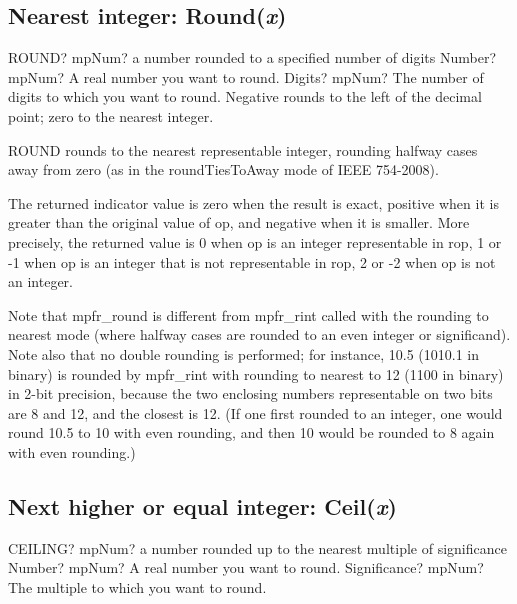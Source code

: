 \subsection{Nearest integer: Round(\textit{x})}

\begin{mpFunctionsExtract}
	\mpWorksheetFunctionTwoNotImplemented
	{ROUND? mpNum? a number rounded to a specified number of digits}
	{Number? mpNum? A real number you want to round.}
	{Digits? mpNum? The number of digits to which you want to round. Negative rounds to the left of the decimal point; zero to the nearest integer.}
\end{mpFunctionsExtract}

\vspace{0.3cm}
ROUND rounds to the nearest representable integer, rounding halfway cases away from zero (as in the roundTiesToAway mode of IEEE 754-2008).

The returned indicator value is zero when the result is exact, positive when it is greater than the
original value of op, and negative when it is smaller. More precisely, the returned value is
0 when op is an integer representable in rop, 1 or -1 when op is an integer that is not
representable in rop, 2 or -2 when op is not an integer.

Note that mpfr\_round is different from mpfr\_rint called with the rounding to nearest mode
(where halfway cases are rounded to an even integer or significand). Note also that no double
rounding is performed; for instance, 10.5 (1010.1 in binary) is rounded by mpfr\_rint with
rounding to nearest to 12 (1100 in binary) in 2-bit precision, because the two enclosing
numbers representable on two bits are 8 and 12, and the closest is 12. (If one first rounded
to an integer, one would round 10.5 to 10 with even rounding, and then 10 would be rounded
to 8 again with even rounding.)


\subsection{Next higher or equal integer: Ceil(\textit{x})}

\begin{mpFunctionsExtract}
	\mpWorksheetFunctionTwoNotImplemented
	{CEILING? mpNum? a number rounded up to the nearest multiple of significance}
	{Number? mpNum? A real number you want to round.}
	{Significance? mpNum? The multiple to which you want to round.}
\end{mpFunctionsExtract}


